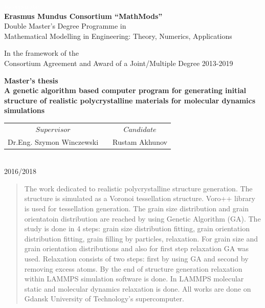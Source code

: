 \documentclass[12pt]{report}
\begin{document}
\begin{center}
    \textcolor{white}{to separate}\\
    \Large{\textbf{Erasmus Mundus Consortium “MathMods”}}\\
    \vspace{10mm}
    \normalsize
    Double Master's Degree Programme in\\
    Mathematical Modelling in Engineering: Theory, Numerics, Applications\\
    \vspace{5mm}
    
    \small{In the framework of the}\\
    \small{Consortium Agreement and Award of a Joint/Multiple Degree 2013-2019}
    \vspace{5mm}
    
    \Large\textbf{Master's thesis}\\
    \Large\textbf{A genetic algorithm based computer program for generating initial structure of realistic polycrystalline materials for molecular dynamics simulations }\\
    \vspace{5mm}
    
    \large
    \begin{tabular}{ccc}
        $Supervisor$ & & $Candidate$\\
        Dr.Eng. Szymon Winczewski  & &  Rustam Akhunov 
    \end{tabular}\\
    
    \vspace{10mm}
    \small
    2016/2018
\end{center}


\author{Rustam Akhunov}


\tableofcontents

\begin{abstract}
The work dedicated to realistic polycrystalline structure generation. The structure is simulated as a Voronoi tessellation structure. Voro++ library is used for tessellation generation. The grain size distribution and grain orientatoin distribution are reached by using Genetic Algorithm (GA). The study is done in 4 steps: grain size distribution fitting, grain orientation distribution fitting, grain filling by particles, relaxation. For grain size and grain orientation distributions and also for first step relaxation GA was used. Relaxation consists of two steps: first by using GA and second by removing excess atoms. By the end of structure generation relaxation within LAMMPS simulation software is done. In LAMMPS molecular static and molecular dynamics relaxation is done. All works are done on Gdansk University of Technology's supercomputer.
\end{abstract}
\end{document}
